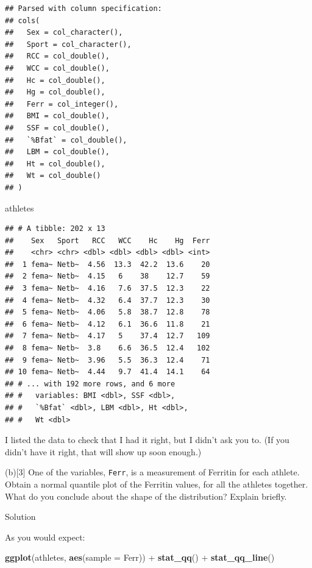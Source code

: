 \documentclass[]{tufte-book}
\newenvironment{Shaded}{}{}
\newcommand{\DataTypeTok}[1]{\textcolor[rgb]{0.56,0.13,0.00}{#1}}
\newcommand{\KeywordTok}[1]{\textcolor[rgb]{0.00,0.44,0.13}{\textbf{#1}}}
\newcommand{\NormalTok}[1]{#1}
\newcommand{\OperatorTok}[1]{\textcolor[rgb]{0.40,0.40,0.40}{#1}}
\newcommand{\StringTok}[1]{\textcolor[rgb]{0.25,0.44,0.63}{#1}}
\theoremstyle{definition}
\theoremstyle{definition}
\theoremstyle{definition}
\theoremstyle{remark}
\begin{document}
\begin{verbatim}
## Parsed with column specification:
## cols(
##   Sex = col_character(),
##   Sport = col_character(),
##   RCC = col_double(),
##   WCC = col_double(),
##   Hc = col_double(),
##   Hg = col_double(),
##   Ferr = col_integer(),
##   BMI = col_double(),
##   SSF = col_double(),
##   `%Bfat` = col_double(),
##   LBM = col_double(),
##   Ht = col_double(),
##   Wt = col_double()
## )
\end{verbatim}

\begin{Shaded}
\begin{Highlighting}[]
\NormalTok{athletes}
\end{Highlighting}
\end{Shaded}

\begin{verbatim}
## # A tibble: 202 x 13
##    Sex   Sport   RCC   WCC    Hc    Hg  Ferr
##    <chr> <chr> <dbl> <dbl> <dbl> <dbl> <int>
##  1 fema~ Netb~  4.56  13.3  42.2  13.6    20
##  2 fema~ Netb~  4.15   6    38    12.7    59
##  3 fema~ Netb~  4.16   7.6  37.5  12.3    22
##  4 fema~ Netb~  4.32   6.4  37.7  12.3    30
##  5 fema~ Netb~  4.06   5.8  38.7  12.8    78
##  6 fema~ Netb~  4.12   6.1  36.6  11.8    21
##  7 fema~ Netb~  4.17   5    37.4  12.7   109
##  8 fema~ Netb~  3.8    6.6  36.5  12.4   102
##  9 fema~ Netb~  3.96   5.5  36.3  12.4    71
## 10 fema~ Netb~  4.44   9.7  41.4  14.1    64
## # ... with 192 more rows, and 6 more
## #   variables: BMI <dbl>, SSF <dbl>,
## #   `%Bfat` <dbl>, LBM <dbl>, Ht <dbl>,
## #   Wt <dbl>
\end{verbatim}

I listed the data to check that I had it right, but I didn't ask you to.
(If you didn't have it right, that will show up soon enough.)

(b){[}3{]} One of the variables, \texttt{Ferr}, is a measurement of
Ferritin for each athlete. Obtain a normal quantile plot of the Ferritin
values, for all the athletes together. What do you conclude about the
shape of the distribution? Explain briefly.

Solution

As you would expect:

\begin{Shaded}
\begin{Highlighting}[]
\KeywordTok{ggplot}\NormalTok{(athletes, }\KeywordTok{aes}\NormalTok{(}\DataTypeTok{sample =}\NormalTok{ Ferr)) }\OperatorTok{+}\StringTok{ }\KeywordTok{stat_qq}\NormalTok{() }\OperatorTok{+}\StringTok{ }
\StringTok{    }\KeywordTok{stat_qq_line}\NormalTok{()}
\end{Highlighting}
\end{Shaded}
\end{document}

